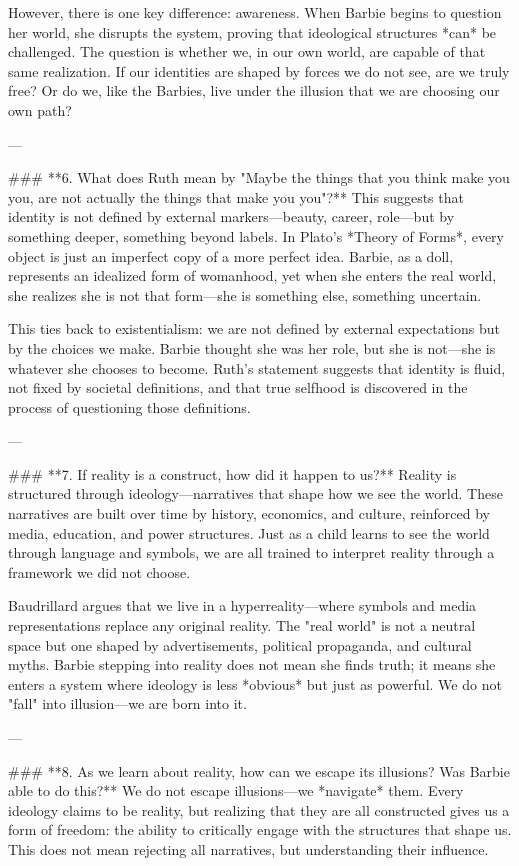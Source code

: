 However, there is one key difference: awareness. When Barbie begins to question her world, she disrupts the system, proving that ideological structures *can* be challenged. The question is whether we, in our own world, are capable of that same realization. If our identities are shaped by forces we do not see, are we truly free? Or do we, like the Barbies, live under the illusion that we are choosing our own path?  

---

### **6. What does Ruth mean by "Maybe the things that you think make you you, are not actually the things that make you you"?**  
This suggests that identity is not defined by external markers—beauty, career, role—but by something deeper, something beyond labels. In Plato’s *Theory of Forms*, every object is just an imperfect copy of a more perfect idea. Barbie, as a doll, represents an idealized form of womanhood, yet when she enters the real world, she realizes she is not that form—she is something else, something uncertain.  

This ties back to existentialism: we are not defined by external expectations but by the choices we make. Barbie thought she was her role, but she is not—she is whatever she chooses to become. Ruth’s statement suggests that identity is fluid, not fixed by societal definitions, and that true selfhood is discovered in the process of questioning those definitions.  

---

### **7. If reality is a construct, how did it happen to us?**  
Reality is structured through ideology—narratives that shape how we see the world. These narratives are built over time by history, economics, and culture, reinforced by media, education, and power structures. Just as a child learns to see the world through language and symbols, we are all trained to interpret reality through a framework we did not choose.  

Baudrillard argues that we live in a hyperreality—where symbols and media representations replace any original reality. The "real world" is not a neutral space but one shaped by advertisements, political propaganda, and cultural myths. Barbie stepping into reality does not mean she finds truth; it means she enters a system where ideology is less *obvious* but just as powerful. We do not "fall" into illusion—we are born into it.  

---

### **8. As we learn about reality, how can we escape its illusions? Was Barbie able to do this?**  
We do not escape illusions—we *navigate* them. Every ideology claims to be reality, but realizing that they are all constructed gives us a form of freedom: the ability to critically engage with the structures that shape us. This does not mean rejecting all narratives, but understanding their influence.  

